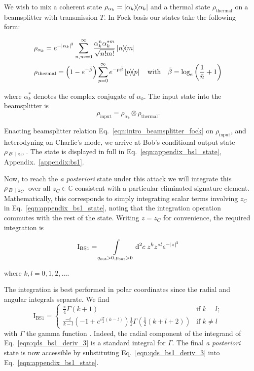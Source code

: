 We wish to mix a coherent state $\rho_{\alpha_k} = \dyad{\alpha_k}$ and a thermal state $\rho_{\text{thermal}}$ on a beamsplitter with transmission $T$. In Fock basis our states take the following form:

\begin{align}
&\rho_{\alpha_k} = e^{-\left|\alpha_k\right|^2} \sum_{n, m=0}^{\infty} \frac{\alpha_k^n \alpha_k^{* m}}{\sqrt{n! m!}} \dyad{n}{m} \notag \\
&\rho_{\text{thermal}} = \left(1 - e^{-\tilde{\beta}}\right) \sum_{p=0}^\infty e^{- p \tilde{\beta}}\dyad{p} \qq{with} \tilde{\beta} = \log_e\left(\frac{1}{\bar{n}} +1\right)
\end{align}

\noindent where $\alpha_k^{*}$ denotes the complex conjugate of $\alpha_k$. The input state into the beamsplitter is
\begin{equation}\label{eqn:qds_bs1_input_state}
\rho_{\text{input}} = \rho_{\alpha_k} \otimes \rho_{\text{thermal}}.
\end{equation}

\noindent Enacting beamsplitter relation Eq.~\ref{eqn:intro_beamsplitter_fock} on $\rho_{\text{input}}$, and heterodyning on Charlie's mode, we arrive at Bob's conditional output state $\rho_{\left. B \; \middle| \; z_C \right.}$. The state is displayed in full in Eq.~\ref{eqn:appendix_bs1_state}, Appendix.~\ref{appendix:bs1}.



Now, to reach the \emph{a posteriori} state under this attack we will integrate this $\rho_{\left. B \; \middle| \; z_C \right.}$ over all $z_C \in \mathbb{C}$ consistent with a particular eliminated signature element. Mathematically, this corresponds to simply integrating scalar terms involving $z_C$ in Eq.~\ref{eqn:appendix_bs1_state}, noting that the integration operation commutes with the rest of the state. Writing $z = z_C$ for convenience, the required integration is

\begin{equation}
\text{I}_{\text{BS}1} = \int\limits_{q_{\text{out}}>0, p_{\text{out}}>0} \mathop{}\!\mathrm{d^2} c \; z^k z^{* l} e^{ - \left| z \right|^2}
\end{equation}

\noindent where $k, l = 0, 1, 2, \dots$.

The integration is best performed in polar coordinates since the radial and angular integrals separate. We find
\begin{equation}\label{eqn:qds_bs1_deriv_3}
\text{I}_{\text{BS}1} =
\begin{cases}
\frac{\pi}{4} \Gamma\left(k+1\right) & \text{if } k = l; \\
\frac{-i}{k-l}\left(-1 + e^{i \frac{\pi}{2}\left(k-l\right)}\right)\frac{1}{2}\Gamma\left(\frac{1}{2}\left(k + l + 2\right) \right) & \text{if } k \ne l
\end{cases}
\end{equation}
with $\Gamma$ the gamma function \cite{mathworld_gamma}. Indeed, the radial component of the integrand of Eq.~\ref{eqn:qds_bs1_deriv_3} is a standard integral for $\Gamma$. The final \emph{a posteriori} state is now accessible by substituting Eq.~\ref{eqn:qds_bs1_deriv_3} into Eq.~\ref{eqn:appendix_bs1_state}.

